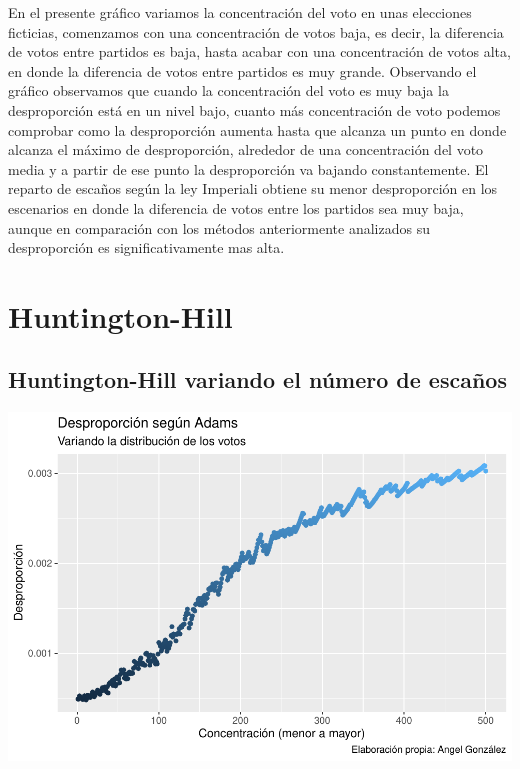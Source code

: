 \documentclass[12pt,a4paper,]{book}
\numberwithin{dummy}{section}
\theoremstyle{ocrenumbox}
\theoremstyle{blacknumex}
\theoremstyle{blacknumbox}
\theoremstyle{ocrenum}
\theoremstyle{ocrenum}
\begin{document}
En el presente gráfico variamos la concentración del voto en unas
elecciones ficticias, comenzamos con una concentración de votos baja, es
decir, la diferencia de votos entre partidos es baja, hasta acabar con
una concentración de votos alta, en donde la diferencia de votos entre
partidos es muy grande. Observando el gráfico observamos que cuando la
concentración del voto es muy baja la desproporción está en un nivel
bajo, cuanto más concentración de voto podemos comprobar como la
desproporción aumenta hasta que alcanza un punto en donde alcanza el
máximo de desproporción, alrededor de una concentración del voto media y
a partir de ese punto la desproporción va bajando constantemente. El
reparto de escaños según la ley Imperiali obtiene su menor desproporción
en los escenarios en donde la diferencia de votos entre los partidos sea
muy baja, aunque en comparación con los métodos anteriormente analizados
su desproporción es significativamente mas alta.

\hypertarget{huntington-hill}{%
\section{Huntington-Hill}\label{huntington-hill}}

\hypertarget{huntington-hill-variando-el-nuxfamero-de-escauxf1os}{%
\subsection{Huntington-Hill variando el número de
escaños}\label{huntington-hill-variando-el-nuxfamero-de-escauxf1os}}

\begin{center}\includegraphics[width=0.95\linewidth]{figurasR/unnamed-chunk-33-1} \end{center}
\end{document}
